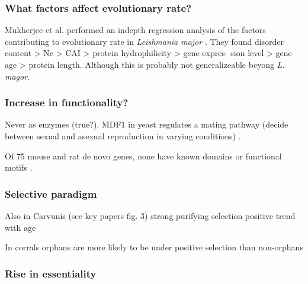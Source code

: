   \subsubsection{What factors affect evolutionary rate?}

  Mukherjee et al. performed an indepth regression analysis of the factors
  contributing to evolutionary rate in \textit{Leishmania major}
  \cite{mukherjee_elucidating_2015}. They found disorder content > Nc > CAI >
  protein hydrophilicity > gene expres- sion level > gene age > protein
  length. Although this is probably not generalizeable beyong \textit{L.
  magor}.
  

  \subsubsection{Increase in functionality?}
        
    Never as enzymes (true?). MDF1 in yeast regulates a mating pathway
    (decide between sexual and asexual reproduction in varying
    conditions) \cite{li_novo_2010}.

    Of 75 mouse and rat de novo genes, none have known domains or
    functional motifs \cite{murphy_novo_2012}.

  \subsubsection{Selective paradigm}


    Also in Carvunis (see key papers fig. 3) strong purifying selection
    positive trend with age \cite{carvunis_proto-genes_2012}


    In corrals orphans are more likely to be under positive selection
    than non-orphans \cite{voolstra_rapid_2011}


    \FloatBarrier

  \subsubsection{Rise in essentiality}


